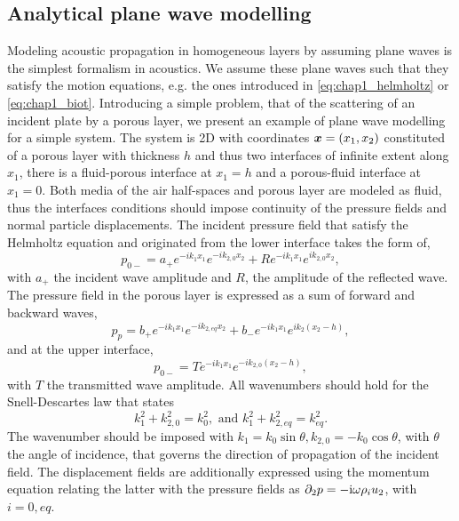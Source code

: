 \subsection{Analytical plane wave modelling}
\label{ssec:GM}

Modeling acoustic propagation in homogeneous layers by assuming plane waves is the simplest formalism in acoustics. We assume these plane waves such that they satisfy the motion equations, e.g. the ones introduced in \cref{eq:chap1_helmholtz} or \cref{eq:chap1_biot}. Introducing a simple problem, that of the scattering of an incident plate by a porous layer, we present an example of plane wave modelling for a simple system. The system is 2D with coordinates $\boldsymbol x = (x_1, x_2)$ constituted of a porous layer with thickness $h$ and thus two interfaces of infinite extent along $x_1$, there is a fluid-porous interface at $x_1 = h$ and a porous-fluid interface at $x_1 = 0$. Both media of the air half-spaces and porous layer are modeled as fluid, thus the interfaces conditions should impose continuity of the pressure fields and normal particle displacements. The incident pressure field that satisfy the Helmholtz equation and originated from the lower interface takes the form of, 
\begin{equation}
    p_{0-} = a_+ e^{-ik_1 x_1} e^{-ik_{2,0} x_2} + R e^{-ik_1 x_1} e^{ik_{2,0} x_2}, 
\end{equation}
with $a_+$ the incident wave amplitude and $R$, the amplitude of the reflected wave. The pressure field in the porous layer is expressed as a sum of forward and backward waves,
\begin{equation}
    p_{p} = b_+ e^{-ik_1 x_1} e^{-ik_{2,eq} x_2} + b_- e^{-ik_1 x_1} e^{ik_2 (x_2-h)},
\end{equation}
and at the upper interface,
\begin{equation}
    p_{0-} = T e^{-ik_1x_1}e^{-ik_{2,0} (x_2-h)},
\end{equation}
with $T$ the transmitted wave amplitude. All wavenumbers should hold for the Snell-Descartes law that states
\begin{equation}
    k_1^2 + k_{2,0}^2 = k_0^2, \,\,\mathrm{ and }\,\, k_1^2 + k_{2,eq}^2 = k_{eq}^2. 
    \label{eq:snell}    
\end{equation}
The wavenumber should be imposed with $k_1 = k_0 \sin{\theta}, k_{2,0} = -k_0 \cos{\theta}$, with $\theta$ the angle of incidence, that governs the direction of propagation of the incident field. The displacement fields are additionally expressed using the momentum equation relating the latter with the pressure fields as $\partial_2 p = -\mathrm i \omega \rho_i u_2$, with $i=0, eq$. 

